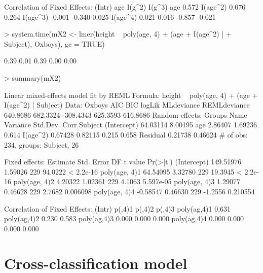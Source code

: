 \documentclass[12pt]{article}
\begin{document}
\begin{Schunk}
\begin{Soutput}
Correlation of Fixed Effects:
         (Intr) age    I(g^2) I(g^3)
age       0.572                     
I(age^2)  0.076  0.264              
I(age^3) -0.001 -0.340  0.025       
I(age^4)  0.021  0.016 -0.857 -0.021
\end{Soutput}
\begin{Sinput}
> system.time(mX2 <- lmer(height ~ poly(age, 4) + (age + I(age^2) | 
+     Subject), Oxboys), gc = TRUE)
\end{Sinput}
\begin{Soutput}
[1] 0.39 0.01 0.39 0.00 0.00
\end{Soutput}
\begin{Sinput}
> summary(mX2)
\end{Sinput}
\begin{Soutput}
Linear mixed-effects model fit by REML
Formula: height ~ poly(age, 4) + (age + I(age^2) | Subject) 
   Data: Oxboys 
      AIC      BIC    logLik MLdeviance REMLdeviance
 640.8686 682.3324 -308.4343   625.3593     616.8686
Random effects:
 Groups   Name        Variance Std.Dev. Corr        
 Subject  (Intercept) 64.03114 8.00195              
          age          2.86407 1.69236  0.614       
          I(age^2)     0.67428 0.82115  0.215 0.658 
 Residual              0.21738 0.46624              
# of obs: 234, groups: Subject, 26

Fixed effects:
               Estimate Std. Error  DF t value  Pr(>|t|)
(Intercept)   149.51976    1.59026 229 94.0222 < 2.2e-16
poly(age, 4)1  64.54095    3.32780 229 19.3945 < 2.2e-16
poly(age, 4)2   4.20322    1.02361 229  4.1063 5.597e-05
poly(age, 4)3   1.29077    0.46628 229  2.7682  0.006098
poly(age, 4)4  -0.58547    0.46630 229 -1.2556  0.210554

Correlation of Fixed Effects:
            (Intr) p(,4)1 p(,4)2 p(,4)3
poly(ag,4)1 0.631                      
poly(ag,4)2 0.230  0.583               
poly(ag,4)3 0.000  0.000  0.000        
poly(ag,4)4 0.000  0.000  0.000  0.000 
\end{Soutput}
\end{Schunk}

\section{Cross-classification model}
\label{sec:CrossClassified}
\end{document}
